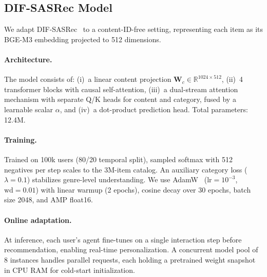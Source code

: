 \subsection{DIF-SASRec Model}
\label{ssec:difsasrec}

We adapt DIF-SASRec~\cite{xie2022difsr} to a content-ID-free setting,
representing each item as its BGE-M3 embedding projected to 512 dimensions.

\paragraph{Architecture.}
The model consists of:
(i)~a linear content projection $\mathbf{W}_c \in \mathbb{R}^{1024 \times 512}$,
(ii)~4 transformer blocks with causal self-attention,
(iii)~a dual-stream attention mechanism with separate Q/K heads for content
and category, fused by a learnable scalar $\alpha$, and
(iv)~a dot-product prediction head.
Total parameters: 12.4M.

\paragraph{Training.}
Trained on 100k users (80/20 temporal split), sampled softmax with 512
negatives per step scales to the 3M-item catalog. An auxiliary category loss
($\lambda = 0.1$) stabilizes genre-level understanding.
We use AdamW~\cite{loshchilov2019decoupled} ($\text{lr}=10^{-3}$,
$\text{wd}=0.01$) with linear warmup (2 epochs), cosine decay over 30 epochs,
batch size 2048, and AMP float16.

\paragraph{Online adaptation.}
At inference, each user's agent fine-tunes on a single interaction step before
recommendation, enabling real-time personalization.
A concurrent model pool of 8 instances handles parallel requests, each
holding a pretrained weight snapshot in CPU RAM for cold-start initialization.
